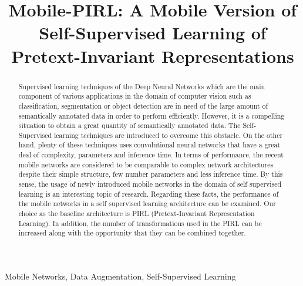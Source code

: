 \documentclass[conference]{IEEEtran}
\begin{document}
\title{Mobile-PIRL: A Mobile Version of Self-Supervised Learning of Pretext-Invariant Representations\\
}

\author{
\and
{}
}

\maketitle

\begin{abstract}
Supervised learning techniques of the Deep Neural Networks which are the main component of various applications in the domain of computer vision such as classification, segmentation or object detection are in need of the large amount of semantically annotated data in order to perform efficiently. However, it is a compelling situation to obtain a great quantity of semantically annotated data. The Self-Supervised learning techniques are introduced to overcome this obstacle. On the other hand, plenty of these techniques uses convolutional neural networks that have a great deal of complexity, parameters and inference time. In terms of performance, the recent mobile networks are considered to be comparable to complex network architectures despite their simple structure, few number parameters and less inference time. By this sense, the usage of newly introduced mobile networks in the domain of self supervised learning is an interesting topic of research. Regarding these facts, the performance of the mobile networks in a self supervised learning architecture can be examined. Our choice as the baseline architecture is PIRL (Pretext-Invariant Representation Learning). In addition, the number of transformations used in the PIRL can be increased along with the opportunity that they can be combined together.  
\end{abstract}

\begin{IEEEkeywords}
Mobile Networks, Data Augmentation, Self-Supervised Learning
\end{IEEEkeywords}
\end{document}
